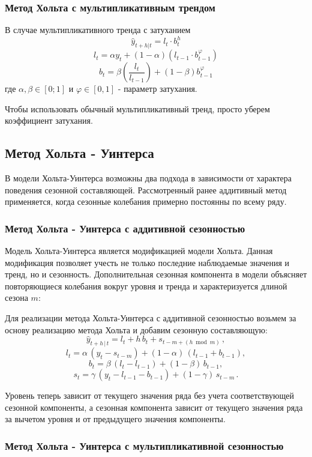 \documentclass[aps,%
12pt,%
final,%
oneside,
onecolumn,%
musixtex, %
superscriptaddress,%
centertags]{article} %
\theoremstyle{plain}
\theoremstyle{definition}
\theoremstyle{remark}
\begin{document}
\subsubsection{Метод Хольта с мультипликативным трендом}

В случае мультипликативного тренда с затуханием
$$\hat{y}_{t+h|t} = l_t \cdot b_t^h$$
$$l_t = \alpha y_t + (1-\alpha)(l_{t-1} \cdot b_{t-1}^{\varphi})$$ 
$$b_t = \beta\left(\frac{l_t}{l_{t-1}}\right) + (1-\beta)b_{t-1}^{\varphi}$$
где $\alpha,\beta \in [0;1]$ и $\varphi \in [0,1]$ - параметр затухания.

Чтобы использовать обычный мультипликативный тренд, просто уберем коэффициент затухания.

\newpage
\subsection{Метод Хольта - Уинтерса}

В модели Хольта-Уинтерса возможны два подхода в зависимости от характера поведения сезонной составляющей. Рассмотренный ранее аддитивный метод применяется, когда сезонные колебания примерно постоянны по всему ряду.

\subsubsection{Метод Хольта - Уинтерса с аддитивной сезонностью}

Модель Хольта-Уинтерса является модификацией модели Хольта. Данная модификация позволяет учесть не только последние наблюдаемые значения и тренд, но и сезонность. Дополнительная сезонная компонента в модели объясняет повторяющиеся колебания вокруг уровня и тренда и характеризуется длиной сезона $m$:

Для реализации метода Хольта-Уинтерса с аддитивной сезонностью возьмем за основу реализацию метода Хольта и добавим сезонную составляющую:
$$\hat{y}_{t+h\, |\, t}=l_t+h\, b_t+s_{t-m+(h\bmod m)}\, ,$$
$$l_t=\alpha\, (y_t-s_{t-m})+(1-\alpha)\, (l_{t-1}+b_{t-1}),$$
$$b_t=\beta\, (l_t-l_{t-1})+(1-\beta)\, b_{t-1},$$
$$s_t=\gamma\, (y_t-l_{t-1}-b_{t-1})+(1-\gamma)\, s_{t-m}\, .$$

Уровень теперь зависит от текущего значения ряда без учета соответствующей сезонной компоненты, а сезонная компонента зависит от текущего значения ряда за вычетом уровня и от предыдущего значения компоненты.

\subsubsection{Метод Хольта - Уинтерса с мультипликативной сезонностью}
\end{document}
